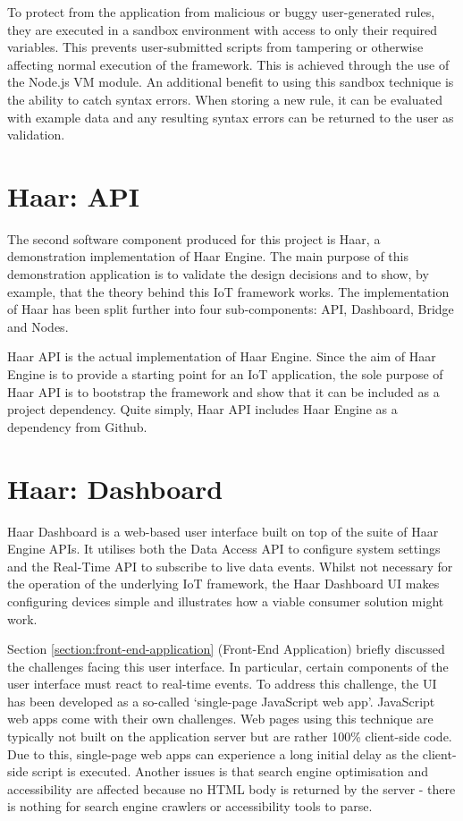     To protect from the application from malicious or buggy user-generated rules, they are executed in a sandbox environment with access to only their required variables. This prevents user-submitted scripts from tampering or otherwise affecting normal execution of the framework. This is achieved through the use of the Node.js VM module. An additional benefit to using this sandbox technique is the ability to catch syntax errors. When storing a new rule, it can be evaluated with example data and any resulting syntax errors can be returned to the user as validation.

  \section{Haar: API}
    The second software component produced for this project is Haar, a demonstration implementation of Haar Engine. The main purpose of this demonstration application is to validate the design decisions and to show, by example, that the theory behind this IoT framework works. The implementation of Haar has been split further into four sub-components: API, Dashboard, Bridge and Nodes.

    Haar API is the actual implementation of Haar Engine. Since the aim of Haar Engine is to provide a starting point for an IoT application, the sole purpose of Haar API is to bootstrap the framework and show that it can be included as a project dependency. Quite simply, Haar API includes Haar Engine as a dependency from Github.

  \section{Haar: Dashboard}
    Haar Dashboard is a web-based user interface built on top of the suite of Haar Engine APIs. It utilises both the Data Access API to configure system settings and the Real-Time API to subscribe to live data events. Whilst not necessary for the operation of the underlying IoT framework, the Haar Dashboard UI makes configuring devices simple and illustrates how a viable consumer solution might work.

    Section \ref{section:front-end-application} (Front-End Application) briefly discussed the challenges facing this user interface. In particular, certain components of the user interface must react to real-time events. To address this challenge, the UI has been developed as a so-called `single-page JavaScript web app'. JavaScript web apps come with their own challenges. Web pages using this technique are typically not built on the application server but are rather 100\% client-side code. Due to this, single-page web apps can experience a long initial delay as the client-side script is executed. Another issues is that search engine optimisation and accessibility are affected because no HTML body is returned by the server - there is nothing for search engine crawlers or accessibility tools to parse.

